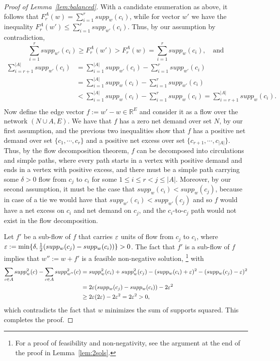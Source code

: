 \begin{proof}[Proof of Lemma~\ref{lem:balanced}]
With a candidate enumeration as above, it follows that $F^A_r(w)=\sum_{i=1}^r supp_w(c_i)$, while for vector $w'$ we have the inequality $F^A_r(w')\leq \sum_{i=1}^r supp_{w'}(c_i)$. 
Thus, by our assumption by contradiction, 
$$\sum_{i=1}^r supp_{w'}(c_i) \geq F_r^A(w') > F_r^A(w) = \sum_{i=1}^r supp_{w}(c_i), \quad \text{and}$$
\begin{align*}
    \sum_{i=r+1}^{|A|} supp_{w'}(c_i) &= \sum_{i=1}^{|A|} supp_{w'}(c_i) - \sum_{i=1}^{r} supp_{w'}(c_i) \\
    & = \sum_{i=1}^{|A|} supp_{w}(c_i) - \sum_{i=1}^{r} supp_{w'}(c_i) \\
    & < \sum_{i=1}^{|A|} supp_{w}(c_i) - \sum_{i=1}^{r} supp_{w}(c_i) 
    = \sum_{i=r+1}^{|A|} supp_{w}(c_i). \\
\end{align*}
Now define the edge vector $f:=w'-w\in\mathbb{R}^E$ and consider it as a flow over the network $(N\cup A, E)$. 
We have that $f$ has a zero net demand over set $N$, by our first assumption, and the previous two inequalities show that $f$ has a positive net demand over set $\{c_1, \cdots, c_r\}$ and a positive net excess over set $\{c_{r+1}, \cdots, c_{|A|}\}$. Thus, by the flow decomposition theorem, $f$ can be decomposed into circulations and simple paths, where every path starts in a vertex with positive demand and ends in a vertex with positive excess, and there must be a simple path carrying some $\delta>0$ flow from $c_j$ to $c_i$ for some $1\leq i\leq r<j\leq |A|$. 
Moreover, by our second assumption, it must be the case that $supp_w(c_i)<supp_w(c_j)$, because in case of a tie we would have that $supp_{w'}(c_i)<supp_{w'}(c_j)$ and so $f$ would have a net excess on $c_i$ and net demand on $c_j$, and the $c_i$-to-$c_j$ path would not exist in the flow decomposition.

Let $f'$ be a sub-flow of $f$ that carries $\varepsilon$ units of flow from $c_j$ to $c_i$, where $\varepsilon:=\min\{\delta, \frac{1}{2}(supp_w(c_j) - supp_w(c_i))\}>0$. 
The fact that $f'$ is a sub-flow of $f$ implies that $w'':=w+f'$ is a feasible non-negative solution,%
\footnote{For a proof of feasibility and non-negativity, see the argument at the end of the proof in Lemma~\ref{lem:2sols}.} 
with 
\begin{align*}
    \sum_{c\in A} supp_{w}^2(c) - \sum_{c\in A} supp_{w''}^2(c) &= supp_{w}^2(c_i) + supp_w^2(c_j) - (supp_{w}(c_i) +\varepsilon)^2 - (supp_{w}(c_j) - \varepsilon)^2\\
    &= 2\varepsilon(supp_w(c_j) - supp_w(c_i)) - 2\varepsilon^2 \\
    &\geq 2\varepsilon(2\varepsilon) - 2\varepsilon^2 = 2\varepsilon^2>0,
\end{align*}
which contradicts the fact that $w$ minimizes the sum of supports squared. This completes the proof. 
\end{proof}



